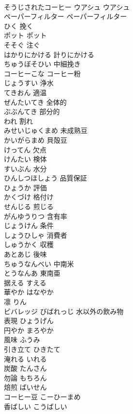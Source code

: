 \documentclass[8pt]{extreport}
\begin{document}
\begin{CJK}{UTF8}{min}
\\	そうじされたコーヒー	ウアシュ	ウアシュ
\\	ペーパーフィルター	ペーパーフィルター
\\	ひく	挽く
\\	ポット	ポット
\\	そそぐ	注ぐ
\\	はかりにかける	計りにかける
\\	ちゅうぼそひい	中細挽き
\\	コーヒーこな	コーヒー粉
\\	じょうすい	浄水
\\	てきおん	適温
\\	ぜんたいてき	全体的
\\	ぶぶんてき	部分的
\\	われ	割れ
\\	みせいじゅくまめ	未成熟豆
\\	かいがらまめ	貝殻豆
\\	けってん	欠点
\\	けんたい	検体
\\	すいぶん	水分
\\	ひんしつほしょう	品質保証
\\	ひょうか	評価
\\	かくづけ	格付け
\\	せんじる	煎じる
\\	がんゆうりつ	含有率
\\	じょうけん	条件
\\	しょうひしゃ	消費者
\\	しゅうかく	収穫
\\	あとあじ	後味
\\	ちゅうなんべい	中南米
\\	とうなんあ	東南亜
\\	据える	すえる	
\\	華やか	はなやか	
\\	凛	りん	
\\	ビバレッジ	びばれっじ	水以外の飲み物
\\	表現	ひょうげん	
\\	円やか	まろやか	
\\	風味	ふうみ	
\\	引き立て	ひきたて	
\\	淹れる	いれる	
\\	炭酸	たんさん	
\\	勿論	もちろん	
\\	焙煎	ばいせん	
\\	コーヒー豆	こーひーまめ	
\\	香ばしい	こうばしい	

\end{CJK}
\end{document}
